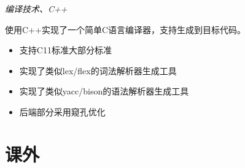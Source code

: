 \documentclass{uniquecv}
\begin{document}
\textit{编译技术、C++}
\vspace{0.4ex}

使用C++实现了一个简单C语言编译器，支持生成到目标代码。
\begin{itemize}
  \item 支持C11标准大部分标准
  \item 实现了类似lex/flex的词法解析器生成工具
  \item 实现了类似yacc/bison的语法解析器生成工具
  \item 后端部分采用窥孔优化
\end{itemize}



\section{课外}
\end{document}
